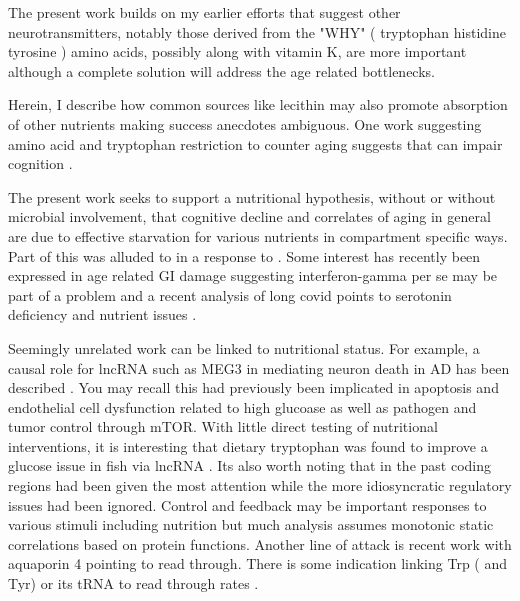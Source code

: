 \documentclass[aps,secnumarabic,balancelastpage,amsmath,amssymb,nofootinbib]{revtex4}
\begin{document}

The present work builds on my earlier efforts 
that suggest other neurotransmitters, notably
those derived from the "WHY" ( tryptophan histidine tyrosine ) 
amino acids, possibly along with
vitamin K, are more important although a complete solution
will address the age related bottlenecks. 

Herein, I describe how common sources
like lecithin may also promote absorption of other nutrients
making success anecdotes ambiguous.  
One work suggesting amino acid and tryptophan restriction
to counter aging suggests that can impair cognition
\cite{CANFIELD201970}.

The present work seeks to support a nutritional hypothesis,
without or without microbial involvement,  that
cognitive decline and correlates of aging in general are due
to effective starvation for various nutrients in compartment
specific ways. Part of this was alluded to in a response to
\mjmdisease \cite{mmarchywka-MJM-2020-002-0.10}
\cite{mmarchywka-MJM-2020-002-0.12rg}. 
Some interest has recently been expressed in age
related GI damage suggesting interferon-gamma per se
may be part of a problem 
\cite{Omrani_Krepelova_Rasa_IFNupgamma_Stat1_axis_drives_2023}
and a recent analysis of long covid points to serotonin deficiency
and nutrient issues \cite{PMID37848036}.

Seemingly unrelated work can be linked to nutritional status.
For example, a  causal role for lncRNA such as MEG3
in mediating neuron death in AD has been described
\cite{Balusu_Horre_Thrupp_MEG3_activates_necroptosis_2023}.
You may recall this had previously been implicated
in apoptosis and endothelial cell dysfunction 
related to high glucoase \cite{PMC6958101}
\cite{Tong_Peng_Gu_LncRNA_MEG3_alleviates_high_2019}
as well as pathogen 
\cite{Pawar_Hanisch_PalmaVera_Down_regulated_lncRNA_MEG3_2016}
and tumor control \cite{YAN2023109340} through mTOR. 
With little direct testing of nutritional interventions,
it is interesting that 
 dietary tryptophan was found to improve  a glucose issue 
in fish via lncRNA \cite{JIA2021737256}.
Its also worth noting that in the past  coding regions 
had been given the most
attention while the more idiosyncratic regulatory issues
had been ignored. Control and feedback may be important responses
to various stimuli including nutrition but much analysis 
assumes monotonic static correlations based on protein functions. 
Another line of attack is recent work with aquaporin 4 pointing 
to read through\cite{PMC10566184}.
There is some indication linking Trp ( and Tyr)  or its tRNA 
to read through rates \cite{PMC8136774}.
\end{document}
